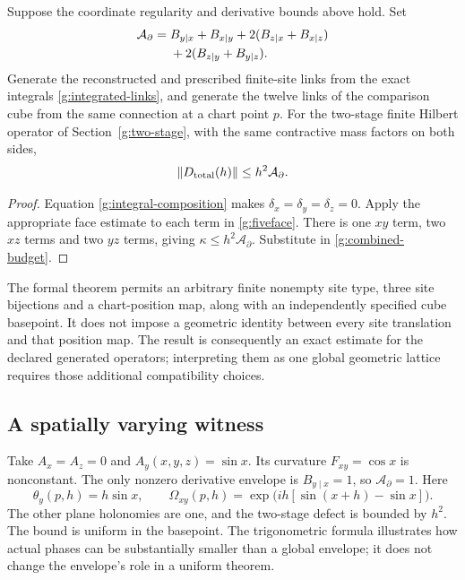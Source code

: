 \begin{theorem}
Suppose the coordinate regularity and derivative bounds above hold. Set
\begin{align}
 \mathcal A_{\partial}={}&B_{y\mid x}+B_{x\mid y}
 +2(B_{z\mid x}+B_{x\mid z})\notag\\
 &+2(B_{z\mid y}+B_{y\mid z}).
 \label{g:derivative-amplitude}
\end{align}
Generate the reconstructed and prescribed finite-site links from the exact integrals \eqref{g:integrated-links}, and generate the twelve links of the comparison cube from the same connection at a chart point $p$. For the two-stage finite Hilbert operator of Section~\ref{g:two-stage}, with the same contractive mass factors on both sides,
\begin{equation}
 \left\lVert D_{\rm total}(h)\right\rVert\leq h^2\mathcal A_{\partial}.
 \label{g:regular-bound}
\end{equation}
\end{theorem}
\begin{proof}
Equation \eqref{g:integral-composition} makes $\delta_x=\delta_y=\delta_z=0$. Apply the appropriate face estimate to each term in \eqref{g:fiveface}. There is one $xy$ term, two $xz$ terms and two $yz$ terms, giving $\kappa\leq h^2\mathcal A_{\partial}$. Substitute in \eqref{g:combined-budget}.
\end{proof}

The formal theorem permits an arbitrary finite nonempty site type, three site bijections and a chart-position map, along with an independently specified cube basepoint. It does not impose a geometric identity between every site translation and that position map. The result is consequently an exact estimate for the declared generated operators; interpreting them as one global geometric lattice requires those additional compatibility choices.

\subsection{A spatially varying witness}
Take $A_x=A_z=0$ and $A_y(x,y,z)=\sin x$. Its curvature $F_{xy}=\cos x$ is nonconstant. The only nonzero derivative envelope is $B_{y\mid x}=1$, so $\mathcal A_{\partial}=1$. Here
\[
 \theta_y(p,h)=h\sin x,\qquad
 \Omega_{xy}(p,h)=\exp\!\bigl(ih[\sin(x+h)-\sin x]\bigr).
\]
The other plane holonomies are one, and the two-stage defect is bounded by $h^2$. The bound is uniform in the basepoint. The trigonometric formula illustrates how actual phases can be substantially smaller than a global envelope; it does not change the envelope's role in a uniform theorem.

